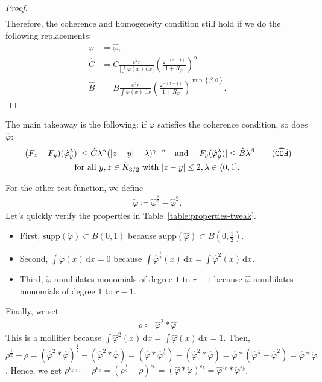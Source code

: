\begin{proof}
\begin{align*}
    \end{align*}
    Therefore, the coherence and homogeneity condition still hold if we do the following replacements:
    \begin{align}
        \varphi &= \hat \varphi, \nonumber
        \\
        \hat C &= C\frac{e^2 r}{|\int \varphi(x)\, \mathrm{d}x|} \left(\frac{2^{-(r+1)}}{1+R_\varphi}\right)^\alpha \label{constant:hat-c}
        \\
        \hat B &= B\frac{e^2 r}{\int \varphi(x)\, \mathrm{d}x} \left(\frac{2^{-(r+1)}}{1+R_\varphi}\right)^{\min\left\{ \beta, 0 \right\} } \nonumber.
    \end{align}
\end{proof}

The main takeaway is the following: if \(\varphi\) satisfies the coherence condition, so does \(\hat \varphi\):
\begin{gather}\label{coherence-hat}
    |(F_z - F_y)(\hat \varphi^\lambda_y)| \leq \hat C \lambda^\alpha(|z-y| + \lambda)^{\gamma - \alpha} \quad \text{and} \quad |F_y(\hat \varphi^\lambda_y)| \leq \hat B\lambda^\beta \tag{\({\widehat{\texttt{COH}}}\)} \\
    \text{for all } y,z \in \bar K_{3/2} \text{ with } |z-y| \leq 2,  \lambda \in (0,1] .\nonumber
\end{gather}

For the other test function, we define
\begin{align*}
    \check \varphi \coloneqq \hat \varphi^{\frac{1}{2}} - \hat \varphi^2.
\end{align*}
Let's quickly verify the properties in Table~\ref{table:properties-tweak}.
\begin{itemize}
    \item First, \(\mathrm{supp}(\check \varphi) \subset B(0,1)\) because \(\mathrm{supp}(\hat \varphi) \subset B(0,\frac{1}{2})\).
    \item Second, \(\int \check \varphi(x) \, \mathrm{d}x = 0\) because \(\int \hat \varphi^{\frac{1}{2}}(x) \, \mathrm{d}x = \int \hat \varphi^2(x) \, \mathrm{d}x\).
    \item Third, \(\check \varphi\) annihilates monomials of degree \(1\) to \(r-1\) because  \(\hat \varphi\) annihilates monomials of degree \(1\) to \(r-1\).
\end{itemize}

Finally, we set 
\begin{align*}
    \rho \coloneqq \hat \varphi^2 * \hat \varphi
\end{align*}
This is a mollifier because \(\int \hat \varphi^2(x) \, \mathrm{d}x = \int \hat \varphi(x)  \, \mathrm{d}x = 1\).  Then, \(\rho^{\frac{1}{2}} - \rho = (\hat \varphi^2 * \hat \varphi)^{\frac{1}{2}} - (\hat \varphi^2 * \hat \varphi) = (\hat \varphi * \hat \varphi^{\frac{1}{2}})- (\hat \varphi^2 * \hat \varphi) = \hat \varphi * (\hat \varphi^{\frac{1}{2}} - \hat \varphi^{2}) = \hat \varphi * \check \varphi\). Hence, we get \(\rho^{\epsilon_{k+1}} - \rho^{\epsilon_k} = (\rho^{\frac{1}{2}} - \rho)^{\epsilon_k} = (\hat \varphi * \check \varphi)^{\epsilon_k} = \hat \varphi^{\epsilon_k} * \check \varphi^{\epsilon_k}\). 

